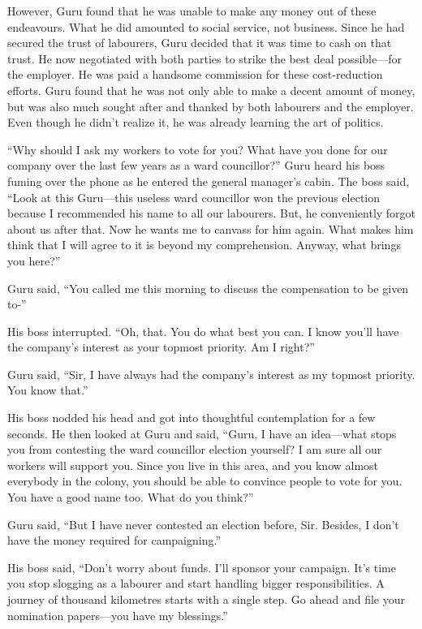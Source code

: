 However, Guru found that he was unable to make any money out of these endeavours.
What he did amounted to social service, not business. Since he had secured the
trust of labourers, Guru decided that it was time to cash on that trust. He now
negotiated with both parties to strike the best deal possible—for the
employer. He was paid a handsome commission for these cost-reduction efforts.
Guru found that he was not only able to make a decent amount of money, but was
also much sought after and thanked by both labourers and the employer. Even
though he didn't realize it, he was already learning the art of politics.

“Why should I ask my workers to vote for you? What have you done for our company
over the last few years as a ward councillor?” Guru heard his boss fuming over
the phone as he entered the general manager's cabin. The boss said, “Look at
this Guru—this useless ward councillor won the previous election because I
recommended his name to all our labourers. But, he conveniently forgot about us
after that. Now he wants me to canvass for him again. What makes him think that
I will agree to it is beyond my comprehension. Anyway, what brings you here?”

Guru said, “You called me this morning to discuss the compensation to be
given to-”

His boss interrupted. “Oh, that. You do what best you can. I know you'll have
the company's interest as your topmost priority. Am I right?”

Guru said, “Sir, I have always had the company's interest as my topmost
priority. You know that.”

His boss nodded his head and got into thoughtful contemplation for a few
seconds. He then looked at Guru and said, “Guru, I have an idea—what stops you
from contesting the ward councillor election yourself? I am sure all our workers
will support you. Since you live in this area, and you know almost everybody in
the colony, you should be able to convince people to vote for you. You have a
good name too. What do you think?”

Guru said, “But I have never contested an election before, Sir. Besides, I don't
have the money required for campaigning.”

His boss said, “Don't worry about funds. I'll sponsor your campaign. It's time
you stop slogging as a labourer and start handling bigger responsibilities. A
journey of thousand kilometres starts with a single step. Go ahead and file your
nomination papers—you have my blessings.”

